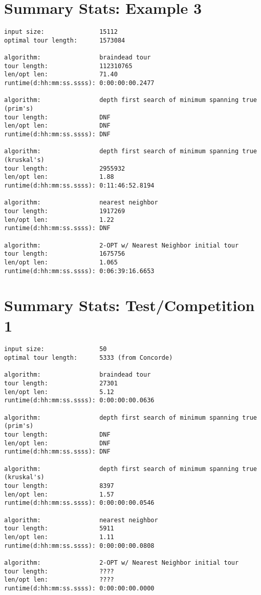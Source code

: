 \documentclass[12pt]{article}
\begin{document}
\newpage
\section*{Summary Stats: Example 3}
\begin{verbatim}
input size:               15112
optimal tour length:      1573084

algorithm:                braindead tour
tour length:              112310765
len/opt len:              71.40
runtime(d:hh:mm:ss.ssss): 0:00:00:00.2477

algorithm:                depth first search of minimum spanning true (prim's) 
tour length:              DNF
len/opt len:              DNF
runtime(d:hh:mm:ss.ssss): DNF

algorithm:                depth first search of minimum spanning true (kruskal's) 
tour length:              2955932
len/opt len:              1.88
runtime(d:hh:mm:ss.ssss): 0:11:46:52.8194

algorithm:                nearest neighbor 
tour length:              1917269
len/opt len:              1.22
runtime(d:hh:mm:ss.ssss): DNF

algorithm:                2-OPT w/ Nearest Neighbor initial tour
tour length:              1675756
len/opt len:              1.065
runtime(d:hh:mm:ss.ssss): 0:06:39:16.6653
\end{verbatim}

\newpage
\section*{Summary Stats: Test/Competition 1}
\begin{verbatim}
input size:               50
optimal tour length:      5333 (from Concorde)

algorithm:                braindead tour
tour length:              27301
len/opt len:              5.12
runtime(d:hh:mm:ss.ssss): 0:00:00:00.0636

algorithm:                depth first search of minimum spanning true (prim's) 
tour length:              DNF
len/opt len:              DNF
runtime(d:hh:mm:ss.ssss): DNF

algorithm:                depth first search of minimum spanning true (kruskal's) 
tour length:              8397
len/opt len:              1.57
runtime(d:hh:mm:ss.ssss): 0:00:00:00.0546

algorithm:                nearest neighbor 
tour length:              5911
len/opt len:              1.11
runtime(d:hh:mm:ss.ssss): 0:00:00:00.0808

algorithm:                2-OPT w/ Nearest Neighbor initial tour
tour length:              ????
len/opt len:              ????
runtime(d:hh:mm:ss.ssss): 0:00:00:00.0000
\end{verbatim}
\end{document}
